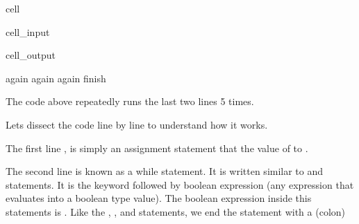 \documentclass[letterpaper,10pt,english]{jupyterBook}
\begin{document}
\begin{sphinxuseclass}{cell}\begin{sphinxVerbatimInput}

\begin{sphinxuseclass}{cell_input}
\begin{sphinxVerbatim}[commandchars=\\\{\}]
  
   
        
\end{sphinxVerbatim}

\end{sphinxuseclass}\end{sphinxVerbatimInput}
\begin{sphinxVerbatimOutput}

\begin{sphinxuseclass}{cell_output}
\begin{sphinxVerbatim}[commandchars=\\\{\}]
again
again
again
finish
\end{sphinxVerbatim}

\end{sphinxuseclass}\end{sphinxVerbatimOutput}

\end{sphinxuseclass}
\sphinxAtStartPar
The code above repeatedly runs the last two lines 5 times.

\sphinxAtStartPar
Lets dissect the code line by line to understand how it works.

\sphinxAtStartPar
The first line , is simply an assignment statement that  the value of  to .

\sphinxAtStartPar
The second line is known as a while statement. It is written similar to  and  statements. It is the  keyword followed by boolean expression (any expression that evaluates into a boolean type value). The boolean expression inside this  statements is . Like the , , and  statements, we end the  statement with a \sphinxcode{\sphinxupquote{:}} (colon)
\end{document}
